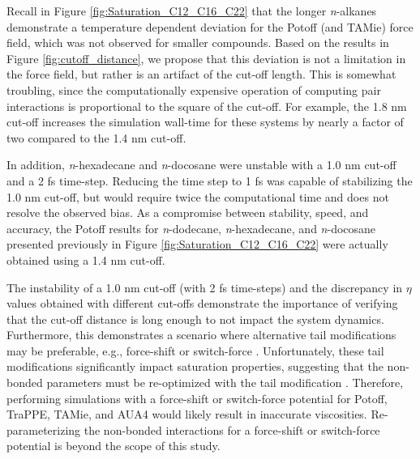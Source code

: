 \documentclass[preprint,review,12pt]{elsarticle}
\begin{document}
	Recall in Figure \ref{fig:Saturation_C12_C16_C22} that the longer \textit{n}-alkanes demonstrate a temperature dependent deviation for the Potoff (and TAMie) force field, which was not observed for smaller compounds. Based on the results in Figure \ref{fig:cutoff_distance}, we propose that this deviation is not a limitation in the force field, but rather is an artifact of the cut-off length. This is somewhat troubling, since the computationally expensive operation of computing pair interactions is proportional to the square of the cut-off. For example, the 1.8 nm cut-off increases the simulation wall-time for these systems by nearly a factor of two compared to the 1.4 nm cut-off.
	
	In addition, \textit{n}-hexadecane and \textit{n}-docosane were unstable with a 1.0 nm cut-off and a 2 fs time-step. Reducing the time step to 1 fs was capable of stabilizing the 1.0 nm cut-off, but would require twice the computational time and does not resolve the observed bias. As a compromise between stability, speed, and accuracy, the Potoff results for \textit{n}-dodecane, \textit{n}-hexadecane, and \textit{n}-docosane presented previously in Figure \ref{fig:Saturation_C12_C16_C22} were actually obtained using a 1.4 nm cut-off.
		
	
	
	
	
	The instability of a 1.0 nm cut-off (with 2 fs time-steps) and the discrepancy in $\eta$ values obtained with different cut-offs demonstrate the importance of verifying that the cut-off distance is long enough to not impact the system dynamics. Furthermore, this demonstrates a scenario where alternative tail modifications may be preferable, e.g., force-shift or switch-force \cite{GROMACS_2018}. Unfortunately, these tail modifications significantly impact saturation properties, suggesting that the non-bonded parameters must be re-optimized with the tail modification \cite{Thol_LJTS,Thol2016_LJ}. Therefore, performing simulations with a force-shift or switch-force potential for Potoff, TraPPE, TAMie, and AUA4 would likely result in inaccurate viscosities. Re-parameterizing the non-bonded interactions for a force-shift or switch-force potential is beyond the scope of this study.
	
\end{document}
